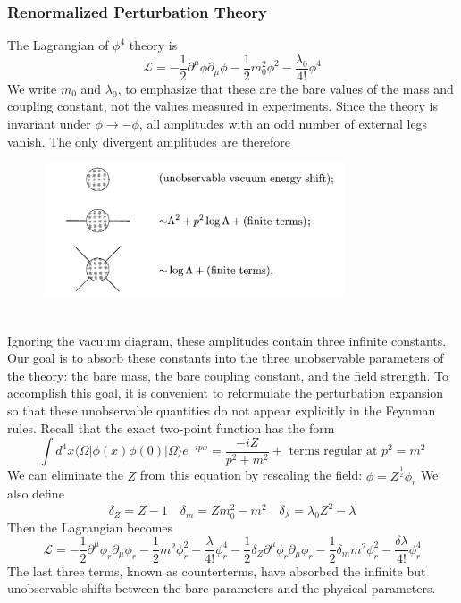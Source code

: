 \documentclass{article}
\begin{document}
\subsubsection{Renormalized Perturbation Theory}
The Lagrangian of $\phi^4$ theory is 
\[\mathcal{L} = -\frac{1}{2} \partial^{\mu} \phi \partial_{\mu} \phi -\frac{1}{2}m_0^2 \phi^2 - \frac{\lambda_0}{4!}\phi^4\]
We write $m_0$ and $\lambda_0$, to emphasize that these are the bare values of the mass and coupling constant, not the values measured in experiments.
Since the theory is invariant under $\phi \to -\phi$, all amplitudes with an odd number of external legs vanish. The only divergent amplitudes are therefore
\begin{figure}[!h]
\centering
\includegraphics[height=4cm ,width=9cm]{./pic/RG1.png}
\caption*{}
\end{figure}\\
Ignoring the vacuum diagram, these amplitudes contain three infinite constants. Our goal is to absorb these constants into the three unobservable parameters of the theory: the bare mass, the bare coupling constant, and the field strength. To accomplish this goal, it is convenient to reformulate the perturbation expansion so that these unobservable quantities do not appear
explicitly in the Feynman rules. Recall that the exact two-point function has the form
\[\int d^4x \langle \Omega | \phi(x) \phi(0) | \Omega \rangle e^{-ipx} = \frac{-iZ}{p^2+m^2} + \mbox{ terms regular at } p^2 = m^2\]
We can eliminate the $Z$ from this equation by rescaling the field:
$\phi = Z^{\frac{1}{2}} \phi_r$
We also define
\[\delta_Z = Z -1 \quad \delta_m = Zm_0^2 - m^2 \quad \delta_{\lambda} = \lambda_0 Z^2 - \lambda\]
Then the Lagrangian becomes
\[\mathcal{L} = -\frac{1}{2} \partial^{\mu} \phi_r \partial_{\mu} \phi_r -\frac{1}{2}m^2 \phi_r^2 - \frac{\lambda}{4!}\phi_r^4 -\frac{1}{2} \delta_Z \partial^{\mu} \phi_r \partial_{\mu} \phi_r -\frac{1}{2}\delta_m m^2 \phi_r^2 - \frac{\delta \lambda}{4!}\phi_r^4\]
The last three terms, known as counterterms, have absorbed the infinite but unobservable shifts between the bare parameters and the physical parameters.\\
\end{document}
